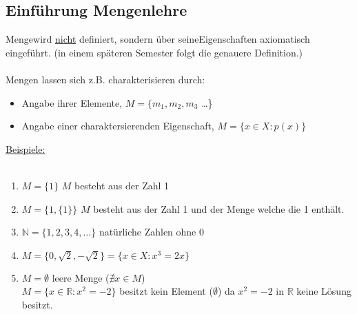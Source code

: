 \subsection{Einführung Mengenlehre}
\glqq Menge\grqq wird \underline{nicht} definiert, sondern über \glqq seine\grqq Eigenschaften axiomatisch eingeführt. (in einem späteren Semester folgt die genauere Definition.)\\
\\
Mengen lassen sich z.B. charakterisieren durch:\\
\begin{itemize}
\item Angabe ihrer Elemente, $M=\{m_{1},m_{2},m_{3}$ \dots\}
\item Angabe einer charaktersierenden Eigenschaft, $M=\{x\in X:p(x)\}$\\
\end{itemize}
\underline{Beispiele:}\\\qquad\\
\begin{enumerate}[label=\roman*]
\item $M=\{1\}$ \qquad $M$ besteht aus der Zahl 1
\item $M=\{1,\{1\}\}$ \qquad $M$ besteht aus der Zahl 1 und der Menge welche die 1 enthält.
\item $\mathbb{N} = \{1,2,3,4,\dots\}$ natürliche Zahlen ohne 0
\item $M = \{0,\sqrt{2},-\sqrt{2}\} = \{x\in X:x^{3}=2x\}$
\item $M = \emptyset$ leere Menge ($\nexists x \in M$)\\
$M=\{x\in\mathbb{R}:x^{2}=-2\}$ besitzt kein Element ($\emptyset$) da $x^{2}=-2$ in $\mathbb{R}$ keine Lösung besitzt.
\end{enumerate}